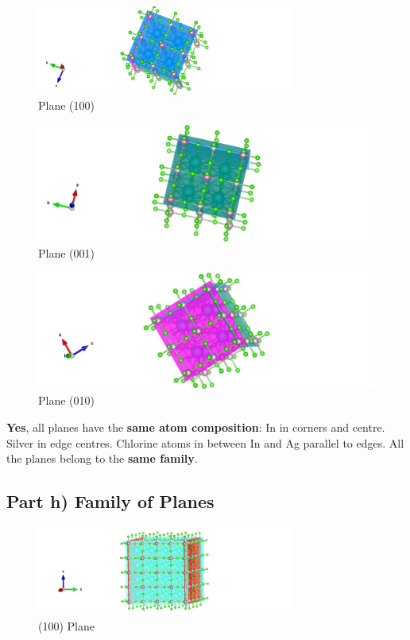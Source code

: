 \documentclass{homework}
\begin{document}
\begin{figure}[!htb]
\includegraphics[width=0.75\textwidth]{q1part_g1.jpg}
\caption{Plane (100)}
\end{figure}
\FloatBarrier

\begin{figure}[ht]
\centering
\includegraphics[width=1\textwidth]{q1part_g2.jpg}
\caption{Plane (001)}
\end{figure}
\FloatBarrier

\begin{figure}[ht]
\centering
\includegraphics[width=1\textwidth]{q1part_g3.jpg}
\caption{Plane (010)}
\end{figure}
\FloatBarrier

\textbf{Yes}, all planes have the \textbf{same atom composition}: In in corners and centre. Silver in edge centres. Chlorine atoms in between In and Ag parallel to edges.
All the planes belong to the \textbf{same family}.


\subsection*{Part h) Family of Planes}

\begin{figure}[ht]
\centering
\includegraphics[width=0.75\textwidth]{q1part_h1.jpg}
\caption{(100) Plane}
\end{figure}
\end{document}
